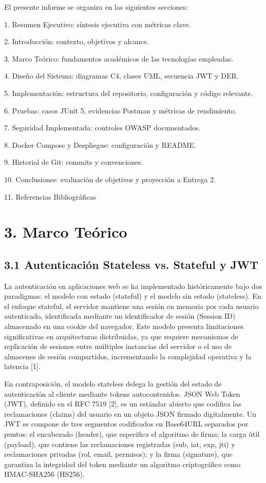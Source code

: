 \documentclass[
]{article}
\begin{document}
El presente informe se organiza en las siguientes secciones:

1. Resumen Ejecutivo: síntesis ejecutiva con métricas clave.

2. Introducción: contexto, objetivos y alcance.

3. Marco Teórico: fundamentos académicos de las tecnologías empleadas.

4. Diseño del Sistema: diagramas C4, clases UML, secuencia JWT y DER.

5. Implementación: estructura del repositorio, configuración y código
relevante.

6. Pruebas: casos JUnit 5, evidencias Postman y métricas de rendimiento.

7. Seguridad Implementada: controles OWASP documentados.

8. Docker Compose y Despliegue: configuración y README.

9. Historial de Git: commits y convenciones.

10. Conclusiones: evaluación de objetivos y proyección a Entrega 2.

11. Referencias Bibliográficas

\section{3. Marco Teórico}

\subsection{3.1 Autenticación Stateless vs. Stateful y
JWT}

La autenticación en aplicaciones web se ha implementado históricamente
bajo dos paradigmas: el modelo con estado (stateful) y el modelo sin
estado (stateless). En el enfoque stateful, el servidor mantiene una
sesión en memoria por cada usuario autenticado, identificada mediante un
identificador de sesión (Session ID) almacenado en una cookie del
navegador. Este modelo presenta limitaciones significativas en
arquitecturas distribuidas, ya que requiere mecanismos de replicación de
sesiones entre múltiples instancias del servidor o el uso de almacenes
de sesión compartidos, incrementando la complejidad operativa y la
latencia {[}1{]}.

En contraposición, el modelo stateless delega la gestión del estado de
autenticación al cliente mediante tokens autocontenidos. JSON Web Token
(JWT), definido en el RFC 7519 {[}2{]}, es un estándar abierto que
codifica las reclamaciones (claims) del usuario en un objeto JSON
firmado digitalmente. Un JWT se compone de tres segmentos codificados en
Base64URL separados por puntos: el encabezado (header), que especifica
el algoritmo de firma; la carga útil (payload), que contiene las
reclamaciones registradas (sub, iat, exp, jti) y reclamaciones privadas
(rol, email, permisos); y la firma (signature), que garantiza la
integridad del token mediante un algoritmo criptográfico como
HMAC-SHA256 (HS256).
\end{document}
